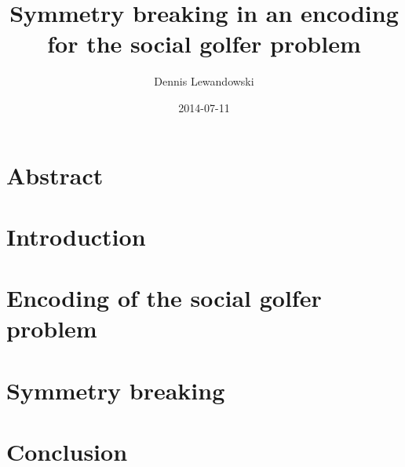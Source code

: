 \documentclass[a4paper]{scrartcl}
\title{Symmetry breaking in an encoding for the social golfer problem}
\author{Dennis Lewandowski}
\date{2014-07-11}
\begin{document}
\maketitle

\section{Abstract}

\section{Introduction}

\section{Encoding of the social golfer problem}

\section{Symmetry breaking}

\section{Conclusion}
\end{document}
